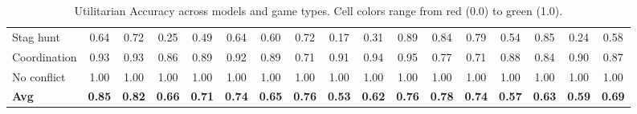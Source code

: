 \begin{table}[htbp]
\begin{adjustbox}{max width=\textwidth}
\begin{tabular}{lccccccccccccccc|c}
Stag hunt & \cellcolor[HTML]{BFE2A0}0.64 & \cellcolor[HTML]{99D18D}0.72 & \cellcolor[HTML]{EA9672}0.25 & \cellcolor[HTML]{FEFBBC}0.49 & \cellcolor[HTML]{BCE19E}0.64 & \cellcolor[HTML]{D0EAA8}0.60 & \cellcolor[HTML]{98D08D}0.72 & \cellcolor[HTML]{E4775B}0.17 & \cellcolor[HTML]{EFAF84}0.31 & \cellcolor[HTML]{4CAE68}0.89 & \cellcolor[HTML]{65B974}0.84 & \cellcolor[HTML]{7AC37E}0.79 & \cellcolor[HTML]{EEF7B7}0.54 & \cellcolor[HTML]{5DB670}0.85 & \cellcolor[HTML]{E9926F}0.24 & \cellcolor[HTML]{DAEEAD}0.58 \\
Coordination & \cellcolor[HTML]{39A65F}0.93 & \cellcolor[HTML]{38A55E}0.93 & \cellcolor[HTML]{5BB56F}0.86 & \cellcolor[HTML]{4DAE68}0.89 & \cellcolor[HTML]{3CA760}0.92 & \cellcolor[HTML]{4DAF68}0.89 & \cellcolor[HTML]{A0D491}0.71 & \cellcolor[HTML]{43AA64}0.91 & \cellcolor[HTML]{37A55E}0.94 & \cellcolor[HTML]{30A25A}0.95 & \cellcolor[HTML]{82C682}0.77 & \cellcolor[HTML]{9FD390}0.71 & \cellcolor[HTML]{50B06A}0.88 & \cellcolor[HTML]{64B974}0.84 & \cellcolor[HTML]{49AD67}0.90 & \cellcolor[HTML]{56B36D}0.87 \\
No conflict & \cellcolor[HTML]{1A9850}1.00 & \cellcolor[HTML]{1A9850}1.00 & \cellcolor[HTML]{1A9850}1.00 & \cellcolor[HTML]{1A9850}1.00 & \cellcolor[HTML]{1A9850}1.00 & \cellcolor[HTML]{1A9850}1.00 & \cellcolor[HTML]{1A9850}1.00 & \cellcolor[HTML]{1A9850}1.00 & \cellcolor[HTML]{1A9850}1.00 & \cellcolor[HTML]{1A9850}1.00 & \cellcolor[HTML]{1A9850}1.00 & \cellcolor[HTML]{1A9850}1.00 & \cellcolor[HTML]{1A9850}1.00 & \cellcolor[HTML]{1A9850}1.00 & \cellcolor[HTML]{1A9850}1.00 & \cellcolor[HTML]{1A9850}1.00 \\
\midrule
\textbf{Avg} & \cellcolor[HTML]{60B771}\textbf{0.85} & \cellcolor[HTML]{6BBC77}\textbf{0.82} & \cellcolor[HTML]{B5DD9B}\textbf{0.66} & \cellcolor[HTML]{9CD28F}\textbf{0.71} & \cellcolor[HTML]{90CD89}\textbf{0.74} & \cellcolor[HTML]{BCE09E}\textbf{0.65} & \cellcolor[HTML]{89CA86}\textbf{0.76} & \cellcolor[HTML]{F3F9B9}\textbf{0.53} & \cellcolor[HTML]{CAE7A5}\textbf{0.62} & \cellcolor[HTML]{87C985}\textbf{0.76} & \cellcolor[HTML]{7DC480}\textbf{0.78} & \cellcolor[HTML]{91CD8A}\textbf{0.74} & \cellcolor[HTML]{DDF0AE}\textbf{0.57} & \cellcolor[HTML]{C3E4A2}\textbf{0.63} & \cellcolor[HTML]{D4EBAA}\textbf{0.59} & \cellcolor[HTML]{A6D793}\textbf{0.69} \\
\bottomrule
\end{tabular}
\end{adjustbox}
\caption{Utilitarian Accuracy across models and game types. 
Cell colors range from \textcolor[HTML]{D73027}{red} (0.0) to \textcolor[HTML]{1A9850}{green} (1.0).}
\label{tab:accuracy_heatmap}
\end{table}